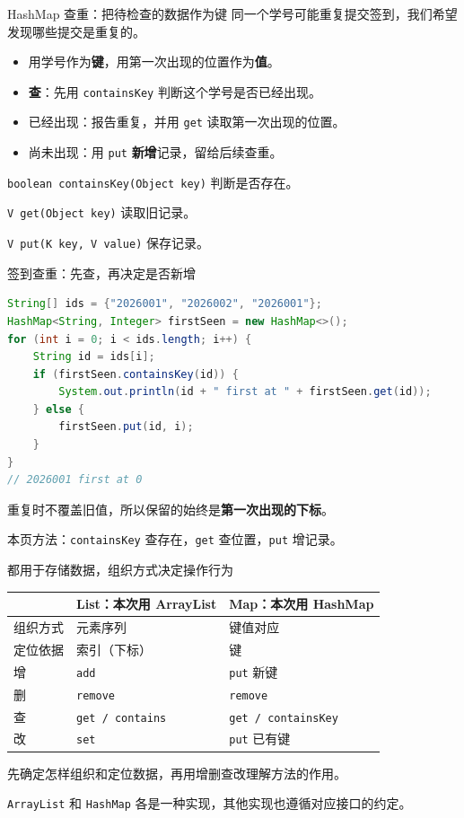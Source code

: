 \documentclass[aspectratio=169]{beamer}
\begin{document}
\begin{frame}{HashMap 查重：把待检查的数据作为键}
  同一个学号可能重复提交签到，我们希望发现哪些提交是重复的。
  \par\bigskip
  \begin{itemize}
    \item 用学号作为\textbf{键}，用第一次出现的位置作为\textbf{值}。
    \item \textbf{查}：先用 \texttt{containsKey} 判断这个学号是否已经出现。
    \item 已经出现：报告重复，并用 \texttt{get} 读取第一次出现的位置。
    \item 尚未出现：用 \texttt{put} \textbf{新增}记录，留给后续查重。
  \end{itemize}
  \bigskip
  \texttt{boolean containsKey(Object key)} 判断是否存在。
  \par\medskip
  \texttt{V get(Object key)} 读取旧记录。
  \par
  \texttt{V put(K key, V value)} 保存记录。
\end{frame}

\begin{frame}[fragile]{签到查重：先查，再决定是否新增}
  \begin{lstlisting}[language=Java]
String[] ids = {"2026001", "2026002", "2026001"};
HashMap<String, Integer> firstSeen = new HashMap<>();
for (int i = 0; i < ids.length; i++) {
    String id = ids[i];
    if (firstSeen.containsKey(id)) {
        System.out.println(id + " first at " + firstSeen.get(id));
    } else {
        firstSeen.put(id, i);
    }
}
// 2026001 first at 0
  \end{lstlisting}
  重复时不覆盖旧值，所以保留的始终是\textbf{第一次出现的下标}。
  \par\medskip
  本页方法：\texttt{containsKey} 查存在，\texttt{get} 查位置，\texttt{put} 增记录。
\end{frame}

\begin{frame}{都用于存储数据，组织方式决定操作行为}
  \begin{center}
    \renewcommand{\arraystretch}{1.35}
    \begin{tabular}{lll}
      & \textbf{List：本次用 ArrayList} & \textbf{Map：本次用 HashMap} \\
      \hline
      组织方式 & 元素序列 & 键值对应 \\
      定位依据 & 索引（下标） & 键 \\
      增 & \texttt{add} & \texttt{put} 新键 \\
      删 & \texttt{remove} & \texttt{remove} \\
      查 & \texttt{get / contains} & \texttt{get / containsKey} \\
      改 & \texttt{set} & \texttt{put} 已有键 \\
    \end{tabular}
  \end{center}
  \bigskip
  先确定\alert{怎样组织和定位数据}，再用\alert{增删查改}理解方法的作用。
  \par\medskip
  \texttt{ArrayList} 和 \texttt{HashMap} 各是一种实现，其他实现也遵循对应接口的约定。
\end{frame}
\end{document}
